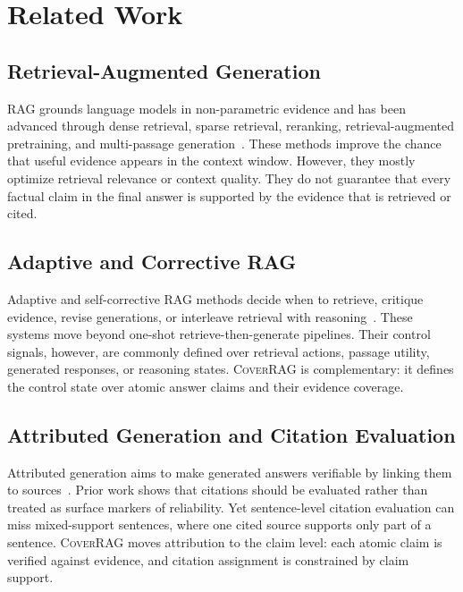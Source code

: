 \section{Related Work}
\label{sec:related_work}

\subsection{Retrieval-Augmented Generation}

RAG grounds language models in non-parametric evidence and has been advanced through dense retrieval, sparse retrieval, reranking, retrieval-augmented pretraining, and multi-passage generation~\cite{guu2020retrieval,lewis2020retrieval,karpukhin2020dense,izacard2021leveraging,izacard2023atlas,borgeaud2022improving,robertson2009probabilistic,nogueira2019passage}. These methods improve the chance that useful evidence appears in the context window. However, they mostly optimize retrieval relevance or context quality. They do not guarantee that every factual claim in the final answer is supported by the evidence that is retrieved or cited.

\subsection{Adaptive and Corrective RAG}

Adaptive and self-corrective RAG methods decide when to retrieve, critique evidence, revise generations, or interleave retrieval with reasoning~\cite{asai2024self,yan2024corrective,jeong2024adaptive,shao2023enhancing,trivedi2023interleaving,yao2023react}. These systems move beyond one-shot retrieve-then-generate pipelines. Their control signals, however, are commonly defined over retrieval actions, passage utility, generated responses, or reasoning states. \textsc{CoverRAG} is complementary: it defines the control state over atomic answer claims and their evidence coverage.

\subsection{Attributed Generation and Citation Evaluation}

Attributed generation aims to make generated answers verifiable by linking them to sources~\cite{bohnet2022attributed,gao2023enabling,gao2023rarr}. Prior work shows that citations should be evaluated rather than treated as surface markers of reliability. Yet sentence-level citation evaluation can miss mixed-support sentences, where one cited source supports only part of a sentence. \textsc{CoverRAG} moves attribution to the claim level: each atomic claim is verified against evidence, and citation assignment is constrained by claim support.


